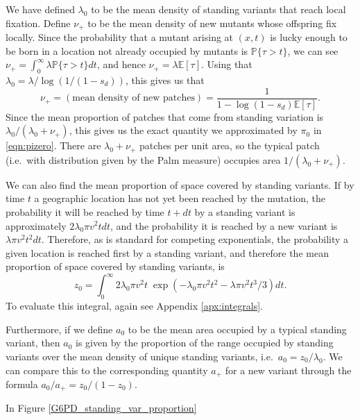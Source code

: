 \documentclass{article}
\renewcommand{\P}{\mathbb{P}}
\newcommand{\E}{\mathbb{E}}
\begin{document}

We have defined $\lambda_0$ to be the mean density of standing variants that reach local fixation.
Define $\nu_+$ to be the mean density of new mutants whose offspring fix locally.
Since the probability that a mutant arising at $(x,t)$ is lucky enough to be born in a location not already occupied by mutants
is $\P\{ \tau > t \}$,
we can see  $\nu_+ = \int_0^\infty \lambda \P\{\tau>t\} dt$, and hence
$\nu_+ = \lambda \E[\tau] $.
Using that $\lambda_0 = \lambda / \log(1/(1-s_d))$, this gives us that
\begin{equation}
    \nu_+ = (\mbox{mean density of new patches}) = \frac{1}{1-\log(1-s_d) \E[\tau]} .
\end{equation}
Since the mean proportion of patches that come from standing variation is $\lambda_0 / (\lambda_0 + \nu_+)$,
this gives us the exact quantity we approximated by $\pi_0$ in \eqref{eqn:pizero}.
There are $\lambda_0 + \nu_+$ patches per unit area, so
the typical patch (i.e.\ with distribution given by the Palm measure) occupies area $1/(\lambda_0 + \nu_+)$.

We can also find the mean proportion of space covered by standing variants.
If by time $t$ a geographic location has not yet been reached by the mutation,
the probability it will be reached by time $t+dt$ 
by a standing variant is approximately $2 \lambda_0 \pi v^2 t dt$, 
and the probability it is reached by a new variant is $\lambda \pi v^2 t^2 dt$.
Therefore, as is standard for competing exponentials,
the probability a given location is reached first by a standing variant,
and therefore the mean proportion of space covered  by standing variants,
is
\begin{equation}
    z_0 = \int_0^\infty {2 \lambda_0 \pi v^2 t} \; \exp \left( - \lambda_0 \pi v^2 t^2 - \lambda \pi v^2 t^3 / 3 \right) dt .
\end{equation}
To evaluate this integral, again see Appendix \ref{apx:integrals}.

Furthermore, if we define $a_0$ to be the mean area occupied by a typical standing variant, 
then $a_0$ is given by the proportion of the range occupied by standing variants over the mean density of unique standing variants,
i.e.\ $a_0 = z_0 / \lambda_0$.
We can compare this to the corresponding quantity $a_+$ for a new variant through the formula
$a_0 / a_+ = z_0 / (1-z_0)$.

In Figure \ref{G6PD_standing_var_proportion} 
\end{document}
